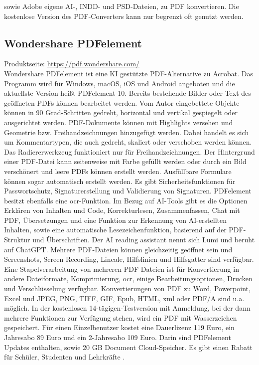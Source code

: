 sowie Adobe eigene AI-, INDD- und PSD-Dateien, zu PDF konvertieren. \cite{adobe-formate} Die kostenlose Version des PDF-Converters kann nur begrenzt oft genutzt werden.

\subsection{Wondershare PDFelement}
Produktseite: \url{https://pdf.wondershare.com/} \\
Wondershare PDFelement ist eine KI gestützte PDF-Alternative zu Acrobat. Das Programm wird für Windows, macOS, iOS und Android angeboten und die aktuellste Version heißt PDFelement 10. Bereits bestehende Bilder oder Text des geöffneten PDFs können bearbeitet werden. Vom Autor eingebettete Objekte können in 90 Grad-Schritten gedreht, horizontal und vertikal gespiegelt oder ausgerichtet werden. PDF-Dokumente können mit Highlights versehen und Geometrie bzw. Freihandzeichnungen hinzugefügt werden. Dabei handelt es sich um Kommentartypen, die auch gedreht, skaliert oder verschoben werden können. Das Radiererwerkzeug funktioniert nur für Freihandzeichnungen. Der Hintergrund einer PDF-Datei kann seitenweise mit Farbe gefüllt werden oder durch ein Bild verschönert und leere PDFs können erstellt werden. Ausfüllbare Formulare können sogar automatisch erstellt werden. Es gibt Sicherheitsfunktionen für Passwortschutz, Signaturerstellung und Validierung von Signaturen. PDFelement besitzt ebenfalls eine \gls{ocr}-Funktion. Im Bezug auf AI-Tools gibt es die Optionen Erklären von Inhalten und Code, Korrekturlesen, Zusammenfassen, Chat mit PDF, Übersetzungen und eine Funktion zur Erkennung von AI-erstellten Inhalten, sowie eine automatische Lesezeichenfunktion, basierend auf der PDF-Struktur und Überschriften. Der AI reading assistant nennt sich Lumi und beruht auf ChatGPT. Mehrere PDF-Dateien können gleichzeitig geöffnet sein und Screenshots, Screen Recording, Lineale, Hilfslinien und Hilfsgatter sind verfügbar. Eine Stapelverarbeitung von mehreren PDF-Dateien ist für Konvertierung in andere Dateiformate, Komprimierung, \gls{ocr}, einige Bearbeitungsoptionen, Drucken und Verschlüsselung verfügbar. Konvertierungen von PDF zu Word, Powerpoint, Excel und JPEG, PNG, TIFF, GIF, Epub, HTML, \gls{xml} oder PDF/A sind u.a. möglich. In der kostenlosen 14-tägigen-Testversion mit Anmeldung, bei der dann mehrere Funktionen zur Verfügung stehen, wird ein PDF mit Wasserzeichen gespeichert. Für einen Einzelbenutzer kostet eine Dauerlizenz 119 Euro, ein Jahresabo 89 Euro und ein 2-Jahresabo 109 Euro. Darin sind PDFelement Updates enthalten, sowie 20 GB Document Cloud-Speicher. Es gibt einen Rabatt für Schüler, Studenten und Lehrkräfte \cite{wondershare-um}.  

